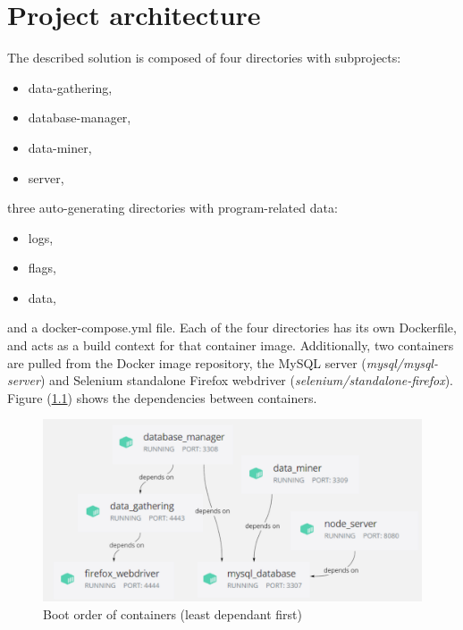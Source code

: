 \chapter{Project architecture}
\label{ch:architecture}
The described solution is composed of four directories with subprojects:
\begin{itemize}
\setlength\itemsep{0.2em}
\item data-gathering,
\item database-manager,
\item data-miner,
\item server,
\end{itemize}
three auto-generating directories with program-related data:
\begin{itemize}
\setlength\itemsep{0.2em}
\item logs,
\item flags,
\item data,
\end{itemize}
and a docker-compose.yml file. Each of the four directories has its own Dockerfile, and acts as a build context for that container image. Additionally, two containers are pulled from the Docker image repository, the MySQL server (\textit{mysql/mysql-server}) and Selenium standalone Firefox webdriver (\textit{selenium/standalone-firefox}).
Figure (\ref{arch:container_dependencies}) shows the dependencies between containers.

\begin{figure}[ht]
    \centering
    \includegraphics[width=\textwidth]{figures/container_dependencies.png}
    \caption{Boot order of containers (least dependant first)}
    \label{arch:container_dependencies}
\end{figure}

